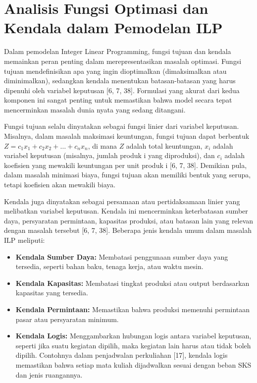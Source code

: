 \documentclass{IEEEtran}
\begin{document}
\section{Analisis Fungsi Optimasi dan Kendala dalam Pemodelan ILP}

Dalam pemodelan Integer Linear Programming, fungsi tujuan dan kendala memainkan peran penting dalam merepresentasikan masalah optimasi. Fungsi tujuan mendefinisikan apa yang ingin dioptimalkan (dimaksimalkan atau diminimalkan), sedangkan kendala menentukan batasan-batasan yang harus dipenuhi oleh variabel keputusan [6, 7, 38]. Formulasi yang akurat dari kedua komponen ini sangat penting untuk memastikan bahwa model secara tepat mencerminkan masalah dunia nyata yang sedang ditangani.

Fungsi tujuan selalu dinyatakan sebagai fungsi linier dari variabel keputusan. Misalnya, dalam masalah maksimasi keuntungan, fungsi tujuan dapat berbentuk $Z = c_1x_1 + c_2x_2 + \dots + c_nx_n$, di mana $Z$ adalah total keuntungan, $x_i$ adalah variabel keputusan (misalnya, jumlah produk i yang diproduksi), dan $c_i$ adalah koefisien yang mewakili keuntungan per unit produk i [6, 7, 38]. Demikian pula, dalam masalah minimasi biaya, fungsi tujuan akan memiliki bentuk yang serupa, tetapi koefisien akan mewakili biaya.

Kendala juga dinyatakan sebagai persamaan atau pertidaksamaan linier yang melibatkan variabel keputusan. Kendala ini mencerminkan keterbatasan sumber daya, persyaratan permintaan, kapasitas produksi, atau batasan lain yang relevan dengan masalah tersebut [6, 7, 38]. Beberapa jenis kendala umum dalam masalah ILP meliputi:

\begin{itemize}
    \item \textbf{Kendala Sumber Daya:} Membatasi penggunaan sumber daya yang tersedia, seperti bahan baku, tenaga kerja, atau waktu mesin.
    \item \textbf{Kendala Kapasitas:} Membatasi tingkat produksi atau output berdasarkan kapasitas yang tersedia.
    \item \textbf{Kendala Permintaan:} Memastikan bahwa produksi memenuhi permintaan pasar atau persyaratan minimum.
    \item \textbf{Kendala Logis:} Menggambarkan hubungan logis antara variabel keputusan, seperti jika suatu kegiatan dipilih, maka kegiatan lain harus atau tidak boleh dipilih. Contohnya dalam penjadwalan perkuliahan [17], kendala logis memastikan bahwa setiap mata kuliah dijadwalkan sesuai dengan beban SKS dan jenis ruangannya.
\end{itemize}
\end{document}
